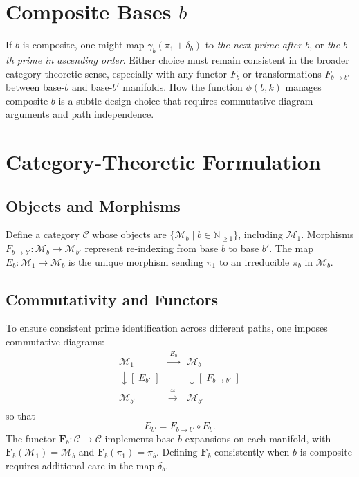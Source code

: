 \documentclass[11pt]{article}
\begin{document}
\section{Composite Bases \texorpdfstring{$b$}{b}}
If $b$ is composite, one might map $\gamma_b(\pi_1 + \delta_b)$ to 
\emph{the next prime after $b$}, or \emph{the $b$-th prime in ascending order}. 
Either choice must remain consistent in the broader category-theoretic sense, 
especially with any functor $F_b$ or transformations $F_{b\to b'}$ 
between base-$b$ and base-$b'$ manifolds. How the function $\phi(b,k)$ 
manages composite $b$ is a subtle design choice that requires 
commutative diagram arguments and path independence.

\section{Category-Theoretic Formulation}

\subsection{Objects and Morphisms}
Define a category $\mathcal{C}$ whose objects are 
$\{\mathcal{M}_b \mid b \in \mathbb{N}_{\ge1}\}$, including 
$\mathcal{M}_1$. Morphisms $F_{b\to b'}: \mathcal{M}_b \to \mathcal{M}_{b'}$ 
represent re-indexing from base $b$ to base $b'$. The map 
$E_b: \mathcal{M}_1 \to \mathcal{M}_b$ is the unique morphism 
sending $\pi_1$ to an irreducible $\pi_b$ in $\mathcal{M}_b$.

\subsection{Commutativity and Functors}
To ensure consistent prime identification across different paths, 
one imposes commutative diagrams:
\[
\begin{array}{ccc}
 \mathcal{M}_1 & \xrightarrow{\;E_b\;} & \mathcal{M}_b \\
 \downarrow[\;E_{b'}\;] & & \downarrow[\;F_{b\to b'}\;]\\
 \mathcal{M}_{b'} & \xrightarrow[\phantom{xx}]{\;\cong\;} & \mathcal{M}_{b'}
\end{array}
\]
so that 
\[
  E_{b'} = F_{b\to b'} \circ E_b.
\]
The functor $\mathbf{F}_b: \mathcal{C}\to \mathcal{C}$ implements 
base-$b$ expansions on each manifold, with $\mathbf{F}_b(\mathcal{M}_1) = \mathcal{M}_b$ 
and $\mathbf{F}_b(\pi_1) = \pi_b$. Defining $\mathbf{F}_b$ consistently 
when $b$ is composite requires additional care in the map $\delta_b$.
\end{document}
